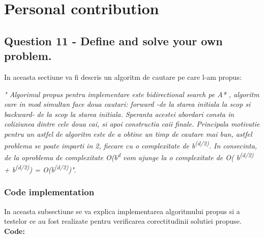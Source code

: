 \section{Personal contribution}

\subsection{Question 11 - Define and solve your own problem.}
In aceasta sectiune va fi descris un algoritm de cautare pe care l-am propus: \newline

\textit{" Algorimul propus pentru implementare este bidirectional search pe A* , algoritm care in mod simultan face doua cautari: forward -de la starea initiala la scop si backward- de la scop la starea initiala. Speranta acestei abordari consta in coliziunea dintre cele doua cai, si apoi constructia caii finale. Principala motivatie pentru un astfel de algoritm este de a obtine un timp de cautare mai bun, astfel problema se poate imparti in 2, fiecare cu o complexitate de b\textsuperscript{(d/2)}. In consecinta, de la oproblema de complexitate O(b\textsuperscript{d} vom ajunge la o complexitate de O( b\textsuperscript{(d/2)} +  b\textsuperscript{(d/2)}) = O(b\textsuperscript{(d/2)})"}.


\subsubsection{Code implementation}
In aceasta subsectiune se va explica implementarea algoritmului propus si a testelor ce au fost realizate pentru verificarea corectitudinii solutiei propuse. \\

\textbf{Code:}

\inputminted[linenos]{python}{code/11_prop_problem.py}


